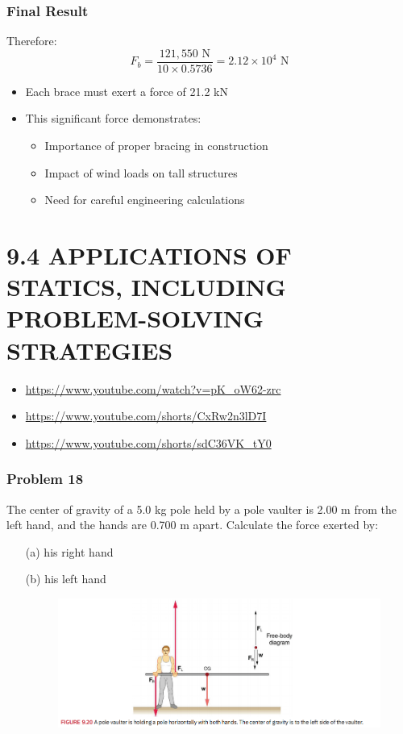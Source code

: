 \documentclass{beamer}
\begin{document}
\begin{frame}
\frametitle{Final Result}
Therefore:
\begin{equation*}
F_b = \frac{121,550\text{ N}}{10 \times 0.5736} = 2.12 \times 10^4\text{ N}
\end{equation*}

\begin{itemize}
    \item Each brace must exert a force of 21.2 kN
    \item This significant force demonstrates:
    \begin{itemize}
        \item Importance of proper bracing in construction
        \item Impact of wind loads on tall structures
        \item Need for careful engineering calculations
    \end{itemize}
\end{itemize}
\end{frame}



\section{9.4 APPLICATIONS OF STATICS, INCLUDING PROBLEM-SOLVING STRATEGIES}


\begin{itemize}
    \item \url{https://www.youtube.com/watch?v=pK_oW62-zrc}
    \item \url{https://www.youtube.com/shorts/CxRw2n3lD7I}
    \item \url{https://www.youtube.com/shorts/sdC36VK_tY0}
\end{itemize}

\begin{frame}
\frametitle{Problem 18}
The center of gravity of a 5.0 kg pole held by a pole vaulter is 2.00 m from the left hand, and the hands are 0.700 m apart. Calculate the force exerted by:
\begin{itemize}
    \item[(a)] his right hand
    \item[(b)] his left hand
\begin{figure}[H]
    \centering
    \includegraphics[width=0.5\linewidth]{CH9/Screenshot 2024-11-07 130412.png}
\end{figure}
\end{itemize}
\end{frame}
\end{document}
